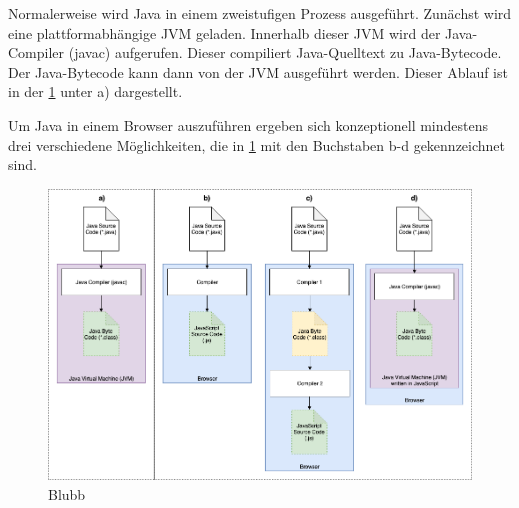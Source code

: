 Normalerweise wird Java in einem zweistufigen Prozess ausgeführt. Zunächst wird eine plattformabhängige JVM geladen. Innerhalb dieser JVM wird der Java-Compiler (javac) aufgerufen. Dieser compiliert Java-Quelltext zu Java-Bytecode. Der Java-Bytecode kann dann von der JVM ausgeführt werden. Dieser Ablauf ist in der \ref{Abbildung 4.4} unter a) dargestellt.

Um Java in einem Browser auszuführen ergeben sich konzeptionell mindestens drei verschiedene Möglichkeiten, die in \ref{Abbildung 4.4} mit den Buchstaben b-d gekennzeichnet sind.

\begin{figure}[H]
    \includegraphics[width=14cm]{chapter/entwurf/Java_JavaScript_Execution.png}
    \centering
    \caption{Blubb}
    \label{Abbildung 4.4}
\end{figure}


